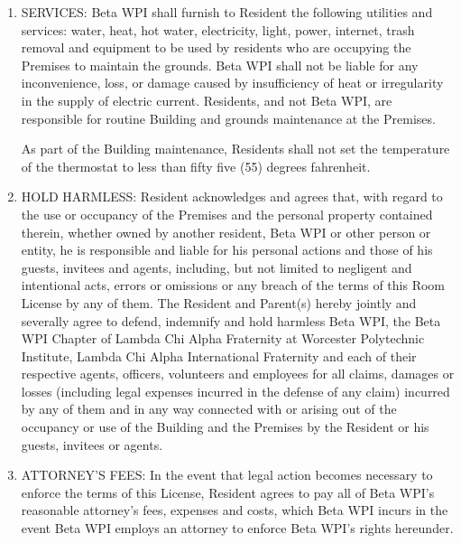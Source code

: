 \documentclass[legalpaper, 12pt]{article} \usepackage{lease}
\begin{document}
\begin{enumerate}
        \item SERVICES: Beta WPI shall furnish to Resident the following
                utilities and services: water, heat, hot water, electricity,
                light, power, internet, trash removal and equipment to be used
                by residents who are occupying the Premises to maintain the
                grounds.  Beta WPI shall not be liable for any inconvenience,
                loss, or damage caused by insufficiency of heat or irregularity
                in the supply of electric current.  Residents, and not Beta WPI,
                are responsible for routine Building and grounds maintenance at
                the Premises.

                As part of the Building maintenance, Residents shall not set the
                temperature of the thermostat to less than fifty five (55)
                degrees fahrenheit.

        \item HOLD HARMLESS: Resident acknowledges and agrees that, with regard
                to the use or occupancy of the Premises and the personal
                property contained therein, whether owned by another resident,
                Beta WPI or other person or entity, he is responsible and liable
                for his personal actions and those of his guests, invitees and
                agents, including, but not limited to negligent and intentional
                acts, errors or omissions or any breach of the terms of this
                Room License by any of them.  The Resident and Parent(s) hereby
                jointly and severally agree to defend, indemnify and hold
                harmless Beta WPI, the Beta WPI Chapter of Lambda Chi Alpha
                Fraternity at Worcester Polytechnic Institute, Lambda Chi Alpha
                International Fraternity and each of their respective agents,
                officers, volunteers and employees for all claims, damages or
                losses (including legal expenses incurred in the defense of any
                claim) incurred by any of them and in any way connected with or
                arising out of the occupancy or use of the Building and the
                Premises by the Resident or his guests, invitees or agents.

        \item ATTORNEY'S FEES: In the event that legal action becomes necessary
                to enforce the terms of this License, Resident agrees to pay all
                of Beta WPI’s reasonable attorney’s fees, expenses and costs,
                which Beta WPI incurs in the event Beta WPI employs an attorney
                to enforce Beta WPI’s rights hereunder.


\end{enumerate}
\end{document}
